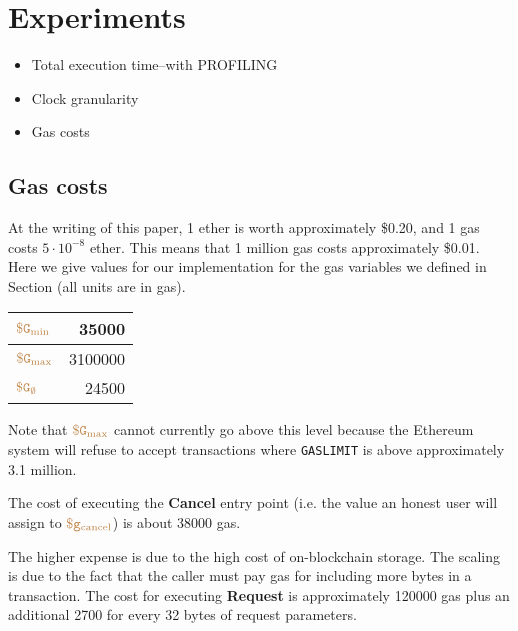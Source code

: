 \section{Experiments}

\begin{itemize}
\item Total execution time--with PROFILING
\item Clock granularity
\item Gas costs
\end{itemize}

\subsection{Gas costs}

At the writing of this paper, 1 ether is worth approximately \$0.20, and 1 gas costs $5 \cdot 10^{-8}$ ether.
This means that 1 million gas costs approximately \$0.01.
Here we give values for our implementation for the gas variables we defined in Section  (all units are in gas).
\begin{center}
  \begin{tabular}{lr}
    \hline
    $\tt {\color{brown} \$G_\text{min} }$ & \num[group-separator={,}]{35000} \\
    \hline
    $\tt {\color{brown} \$G_\text{max} }$ & \num[group-separator={,}]{3100000} \\
    \hline
    $\tt {\color{brown} \$G_\emptyset }$ & \num[group-separator={,}]{24500} \\
    \hline
  \end{tabular}
\end{center}
Note that $\tt {\color{brown} \$G_\text{max} }$ cannot currently go above this level because the Ethereum system will refuse to accept transactions where {\tt GASLIMIT} is above approximately 3.1 million.

The cost of executing the {\bf Cancel} entry point (i.e. the value an honest user will assign to $\tt {\color{brown} \$g_\text{cancel} }$) is about \num[group-separator={,}]{38000} gas.

The higher expense is due to the high cost of on-blockchain storage.
The scaling is due to the fact that the caller must pay gas for including more bytes in a transaction.
The cost for executing {\bf Request} is approximately \num[group-separator={,}]{120000} gas plus an additional \num[group-separator={,}]{2700} for every 32 bytes of request parameters.


